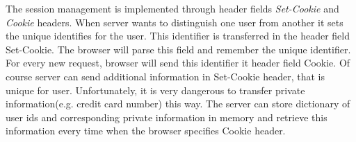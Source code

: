 The session management is implemented through header fields  \textit{Set-Cookie} and \textit{Cookie} headers. When server wants to distinguish one user from another it sets the unique identifies for the user. This identifier is transferred in the header field Set-Cookie. The browser will parse this field and remember the unique identifier. For every new request, browser will send this identifier it header field Cookie. Of course server can send additional information in Set-Cookie header, that is unique for user. Unfortunately, it is very dangerous to transfer private information(e.g. credit card number) this way. The server can store dictionary of user ids and corresponding private information in memory and retrieve this information every time when the browser specifies Cookie header. 


\newpage


